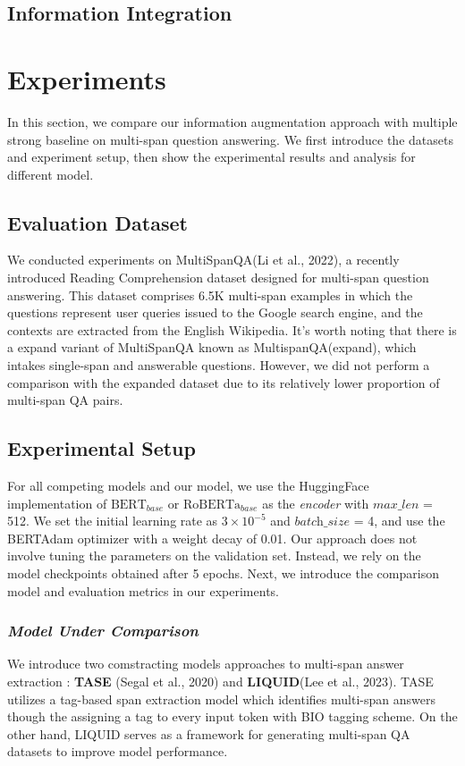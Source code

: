 \documentclass[mathematics,article,submit,moreauthors]{Definitions/mdpi}
\newcommand{\1}[1]{\mathds{1}\left[#1\right]}
\begin{document}
\subsection{Information Integration}
\label{sec:information_integration}




\section{Experiments}
In this section, we compare our information augmentation approach with multiple strong baseline on multi-span question answering. We first introduce the datasets and experiment setup, then show the experimental results and analysis for different model.

\subsection{Evaluation Dataset}
\label{sec:datasets}
	 We conducted experiments on MultiSpanQA(Li et al., 2022), a recently introduced Reading Comprehension dataset designed for multi-span question answering. This dataset comprises 6.5K multi-span examples in which the questions represent user queries issued to the Google search engine, and the contexts are extracted from the English Wikipedia. It's worth noting that there is a expand variant of MultiSpanQA known as MultispanQA(expand), which intakes single-span and answerable questions. However, we did not perform a comparison with the expanded dataset due to its relatively lower proportion of multi-span QA pairs.

\subsection{Experimental Setup}
	For all competing models and our model, we use the HuggingFace implementation of $\text{BERT}_{base}$ or $\text{RoBERTa}_{base}$ as the \textit{encoder} with $\textit{max\_len}$ = 512. We set the initial learning rate as $3 \times 10^{-5}$ and  $\textit{batch\_size}$ = 4, and use the BERTAdam optimizer with a weight decay of 0.01. Our approach does not involve tuning the parameters on the validation set. Instead, we rely on the model checkpoints obtained after 5 epochs. Next, we introduce the comparison model and evaluation metrics in our experiments.
	
	\subsubsection{\textit{Model Under Comparison}}
	\label{sec:baselines}
	We introduce two comstracting models approaches to multi-span answer extraction : \textbf{TASE} (Segal et al., 2020) and \textbf{LIQUID}(Lee et al., 2023). TASE utilizes a tag-based span extraction model which identifies multi-span answers though the assigning a tag to every input token with BIO tagging scheme. On the other hand, LIQUID serves as a framework for generating multi-span QA datasets to improve model performance.
	
\end{document}
